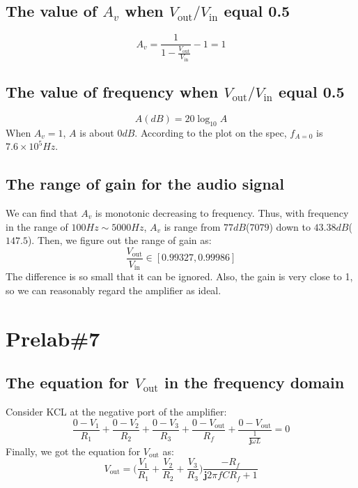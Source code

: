 \documentclass{IEEEtran}
\begin{document}
	\subsection{The value of $A_v$ when $V_{\mathrm{out}}/V_{\mathrm{in}}$ equal 0.5}
	\begin{equation*}
		A_v = \frac{1}{1-\frac{V_{\mathrm{out}}}{V_{\mathrm{in}}}} - 1 = 1
	\end{equation*}
	\subsection{The value of frequency when $V_{\mathrm{out}}/V_{\mathrm{in}}$ equal 0.5}
	\begin{equation*}
		A(\si{dB}) = 20\log_{10}{A}
	\end{equation*}
	\phantom{ } When $A_v=1$, $A$ is about $0\si{dB}$. According to the plot on the spec, $f_{A=0}$ is $7.6\times10^5\si{Hz}$.
	\subsection{The range of gain for the audio signal}
	We can find that $A_v$ is monotonic decreasing to frequency. Thus, with frequency in the range of $100\si{Hz}\sim5000\si{Hz}$, $A_v$ is range from $77\si{dB}$($7079$) down to $43.38\si{dB}$($147.5$). Then, we figure out the range of gain as:
	\begin{equation*}
		\frac{V_{\mathrm{out}}}{V_{\mathrm{in}}} \in [0.99327, 0.99986]
	\end{equation*}
	The difference is so small that it can be ignored. Also, the gain is very close to 1, so we can reasonably regard the amplifier as ideal.
	
	\section{\textbf{Prelab\#7}}
	\subsection{The equation for $V_{\mathrm{out}}$ in the frequency domain}
	Consider KCL at the negative port of the amplifier:
	\begin{equation*}
		\frac{0-V_1}{R_1} + \frac{0-V_2}{R_2} + \frac{0-V_3}{R_3} + \frac{0-V_{\mathrm{out}}}{R_f} + \frac{0-V_{\mathrm{out}}}{\frac{1}{\mathbf{j}\omega L}} = 0
	\end{equation*}
	Finally, we got the equation for $V_{\mathrm{out}}$ as:
	\begin{equation*}
		V_{\mathrm{out}} = \bigg(\frac{V_1}{R_1} + \frac{V_2}{R_2} + \frac{V_3}{R_3}\bigg) \frac{-R_f}{\mathbf{j}2\pi fCR_f+1}
	\end{equation*}
\end{document}
